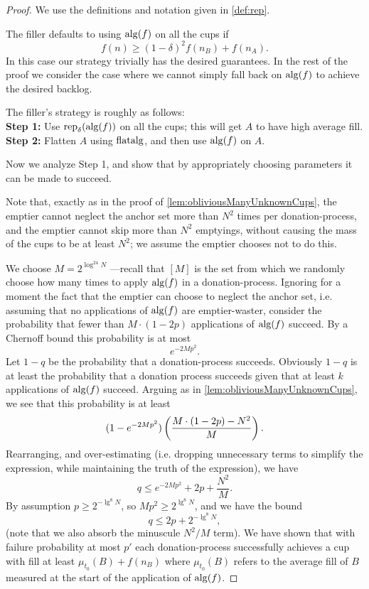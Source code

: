 \begin{proof}
  We use the definitions and notation given in \cref{def:rep}. 

  The filler defaults to using $\operatorname{\text{\textup{alg}}}(f)$ on all the cups if 
  $$f(n) \ge (1-\delta)^2 f(n_B) + f(n_A).$$
  In this case our strategy trivially has the desired guarantees. 
  In the rest of the proof we consider the case where we cannot
  simply fall back on $\operatorname{\text{\textup{alg}}}(f)$ to achieve the desired backlog.

  The filler's strategy is roughly as follows:\\
  \textbf{Step 1:} Use $\operatorname{\text{\textup{rep}}}_\delta(\operatorname{\text{\textup{alg}}}(f))$ on all the cups;
  this will get $A$ to have high average fill.\\
  \textbf{Step 2:} Flatten $A$ using $\operatorname{\text{\textup{flatalg}}}$, and then use
  $\operatorname{\text{\textup{alg}}}(f)$ on $A$.

  Now we analyze Step 1, and show that by appropriately choosing
  parameters it can be made to succeed.

  Note that, exactly as in the proof of
  \cref{lem:obliviousManyUnknownCups}, the emptier cannot neglect
  the anchor set more than $N^2$ times per donation-process, and
  the emptier cannot skip more than $N^2$ emptyings, without
  causing the mass of the cups to be at least $N^2$; we assume the
  emptier chooses not to do this.

  We choose $M = 2^{\log^{24} N}$ ---recall that $[M]$ is
  the set from which we randomly choose how many times to apply $\operatorname{\text{\textup{alg}}}(f)$
  in a donation-process. 
  Ignoring for a moment the fact that the emptier can choose to
  neglect the anchor set, i.e. assuming that no applications of
  $\operatorname{\text{\textup{alg}}}(f)$ are emptier-waster, consider the probability
  that fewer than $M\cdot (1-2p)$ applications of $\operatorname{\text{\textup{alg}}}(f)$ succeed. By a
  Chernoff bound this probability is at most $$e^{-2Mp^2}.$$
  Let $1-q$ be the probability that a donation-process succeeds.
  Obviously $1-q$ is at least
  the probability that a donation process succeeds given that at least
  $k$ applications of $\operatorname{\text{\textup{alg}}}(f)$ succeed. Arguing as in
  \cref{lem:obliviousManyUnknownCups}, we see that this
  probability is at least $$(1-e^{-2Mp^2})\left( \frac{M\cdot (1-2p)-N^2}{M} \right).$$
  Rearranging, and over-estimating (i.e. dropping unnecessary
  terms to simplify the expression, while maintaining the truth
  of the expression), we have 
  $$q \le e^{-2Mp^2} + 2p + \frac{N^2}{M}.$$
  By assumption $p \ge 2^{-\lg^8 N}$, so $Mp^2 \ge 2^{\lg^8 N}$,
  and we have the bound
  $$q \le 2p + 2^{-\lg^8 N},$$ (note that we also absorb the minuscule $N^2/M$
  term).
  We have shown that with failure probability at most $p'$ each
  donation-process successfully achieves a cup with fill at least
  $\mu_{t_0}(B) + f(n_B)$ where $\mu_{t_0}(B)$ refers to the
  average fill of $B$ measured at the start of the application of
  $\operatorname{\text{\textup{alg}}}(f)$.


\end{proof}
